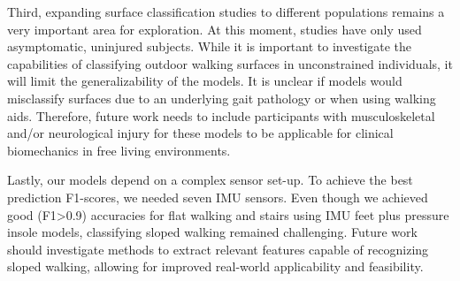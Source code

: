 \documentclass[sensors,article,submit,pdftex,moreauthors]{Definitions/mdpi}
\begin{document}
Third, expanding surface classification studies to different populations remains a very important area for exploration. At this moment, studies have only used asymptomatic, uninjured subjects. While it is important to investigate the capabilities of classifying outdoor walking surfaces in unconstrained individuals, it will limit the generalizability of the models. It is unclear if models would misclassify surfaces due to an underlying gait pathology or when using walking aids. Therefore, future work needs to include participants with musculoskeletal and/or neurological injury for these models to be applicable for clinical biomechanics in free living environments.  

Lastly, our models depend on a complex sensor set-up. To achieve the best prediction F1-scores, we needed seven IMU sensors. \textcolor{revision}{Even though we achieved good (F1>0.9) accuracies for flat walking and stairs using IMU feet plus pressure insole models, classifying sloped walking remained challenging.} Future work should investigate methods to \textcolor{revision}{extract relevant features capable of recognizing sloped walking}, allowing for improved real-world applicability and feasibility.

\end{document}

